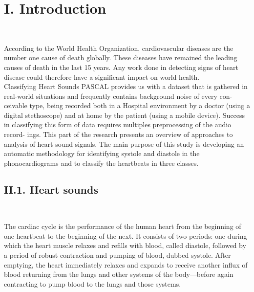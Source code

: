 \documentclass[11pt]{report}
\theoremstyle{plain}
\theoremstyle{definition}
\theoremstyle{definition}
\theoremstyle{proposition}
\begin{document}
\tableofcontents

\newpage

\chapter*{I. Introduction}

\

According to the World Health Organization, cardiovascular diseases are the
number one cause of death globally. These diseases have remained the leading
causes of death in the last 15 years. Any work done in detecting signs of heart
disease could therefore have a significant impact on world health.
\\

Classifying Heart Sounds PASCAL provides us with a dataset that is gathered
in real-world situations and frequently contains background noise of every con-
ceivable type, being recorded both in a Hospital environment by a doctor (using a
digital stethoscope) and at home by the patient (using a mobile device). Success in
classifying this form of data requires multiples preprocessing of the audio record-
ings. This part of the research presents an overview of approaches to analysis of
heart sound signals. The main purpose of this study is developing an automatic
methodology for identifying systole and diastole in the phonocardiograms and to
classify the heartbeats in three classes.
\\


\section*{II.1. Heart sounds}

\

The cardiac cycle is the performance of the human heart from the beginning of one heartbeat to the beginning of the next. It consists of two periods: one during which the heart muscle relaxes and refills with blood, called diastole, followed by a period of robust contraction and pumping of blood, dubbed systole. After emptying, the heart immediately relaxes and expands to receive another influx of blood returning from the lungs and other systems of the body—before again contracting to pump blood to the lungs and those systems.
\\
\end{document}
